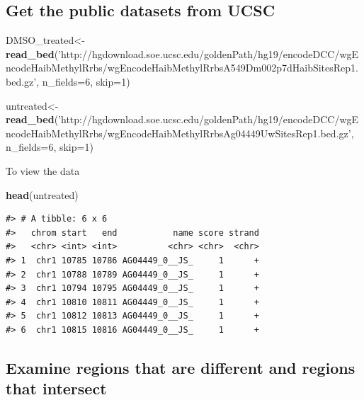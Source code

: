 \documentclass[9pt,a4paper]{extarticle}
\renewcommand{\KeywordTok}[1]{\textbf{{#1}}}
\renewcommand{\DataTypeTok}[1]{\textcolor[rgb]{0.50,0.00,0.00}{{#1}}}
\renewcommand{\DecValTok}[1]{\textcolor[rgb]{0.00,0.00,1.00}{{#1}}}
\renewcommand{\StringTok}[1]{\textcolor[rgb]{0.87,0.00,0.00}{{#1}}}
\renewcommand{\NormalTok}[1]{{#1}}
\begin{document}
\subsection{Get the public datasets from
UCSC}\label{get-the-public-datasets-from-ucsc}


\begin{Shaded}
\begin{Highlighting}[]
\NormalTok{DMSO_treated<-}\KeywordTok{read_bed}\NormalTok{(}\StringTok{'http://hgdownload.soe.ucsc.edu/goldenPath/hg19/encodeDCC/wgEncodeHaibMethylRrbs/wgEncodeHaibMethylRrbsA549Dm002p7dHaibSitesRep1.bed.gz'}\NormalTok{, }\DataTypeTok{n_fields=}\DecValTok{6}\NormalTok{, }\DataTypeTok{skip=}\DecValTok{1}\NormalTok{)}
\end{Highlighting}
\end{Shaded}

\begin{Shaded}
\begin{Highlighting}[]
\NormalTok{untreated<-}\KeywordTok{read_bed}\NormalTok{(}\StringTok{'http://hgdownload.soe.ucsc.edu/goldenPath/hg19/encodeDCC/wgEncodeHaibMethylRrbs/wgEncodeHaibMethylRrbsAg04449UwSitesRep1.bed.gz'}\NormalTok{, }\DataTypeTok{n_fields=}\DecValTok{6}\NormalTok{, }\DataTypeTok{skip=}\DecValTok{1}\NormalTok{)}
\end{Highlighting}
\end{Shaded}

To view the data

\begin{Shaded}
\begin{Highlighting}[]
\KeywordTok{head}\NormalTok{(untreated)}
\end{Highlighting}
\end{Shaded}

\begin{verbatim}
#> # A tibble: 6 x 6
#>   chrom start   end           name score strand
#>   <chr> <int> <int>          <chr> <chr>  <chr>
#> 1  chr1 10785 10786 AG04449_0__JS_     1      +
#> 2  chr1 10788 10789 AG04449_0__JS_     1      +
#> 3  chr1 10794 10795 AG04449_0__JS_     1      +
#> 4  chr1 10810 10811 AG04449_0__JS_     1      +
#> 5  chr1 10812 10813 AG04449_0__JS_     1      +
#> 6  chr1 10815 10816 AG04449_0__JS_     1      +
\end{verbatim}

\subsection{Examine regions that are different and regions that
intersect}\label{examine-regions-that-are-different-and-regions-that-intersect}
\end{document}
